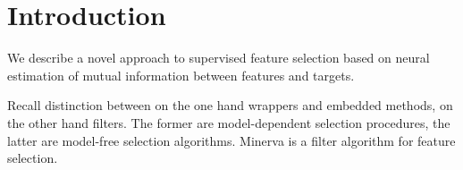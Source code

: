 \section{Introduction}
We describe 
a novel approach to supervised feature selection 
based on 
neural estimation of mutual information 
between
features 
and 
targets.


Recall distinction between
on the one hand
wrappers and embedded methods,
on the other hand
filters. 
The former are model-dependent selection procedures,
the latter are model-free selection algorithms.
Minerva is a filter algorithm for feature selection.




